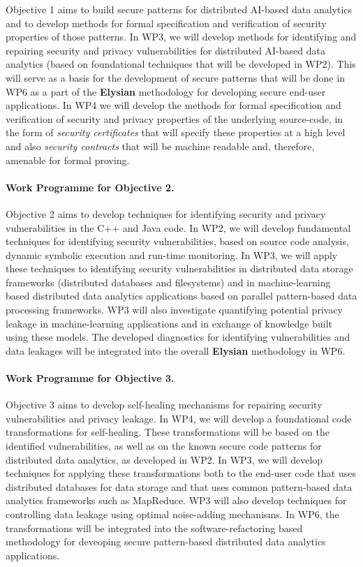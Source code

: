 \documentclass[a4paper,11pt]{article}
\newcommand{\project}[1]{\textbf{#1}\xspace}
\newcommand{\SECURITY}{\project{Elysian}}
\newcommand{\TheProject}{\SECURITY}
\begin{document}
Objective 1 aims to build secure patterns for distributed AI-based data analytics and to develop methods for formal specification and verification of security properties of those patterns. In WP3, we will develop methods for identifying and repairing security and privacy vulnerabilities for distributed AI-based data analytics (based on foundational techniques that will be developed in WP2). This will serve as a basis for the development of secure patterns that will be done in WP6 as a part of the \TheProject{} methodology for developing secure end-user applications. In WP4 we will develop the methods for formal specification and verification of security and privacy properties of the underlying source-code, in the form of \emph{security certificates} that will specify these properties at a high level and also \emph{security contracts} that will be machine readable and, therefore, amenable for formal proving. 

\paragraph*{Work Programme for Objective 2.}

Objective 2 aims to develop techniques for identifying security and privacy vulnerabilities in the C++ and Java code. In WP2, we will develop fundamental techniques for identifying security vulnerabilities, based on source code analysis, dynamic symbolic execution and run-time monitoring. In WP3, we will apply these techniques to identifying security vulnerabilities in distributed data storage frameworks (distributed databases and filesystems) and in machine-learning based distributed data analytics applications based on parallel pattern-based data processing frameworks. WP3 will also investigate quantifying potential privacy leakage in machine-learning applications and in exchange of knowledge built using these models. The developed diagnostics for identifying vulnerabilities and data leakages will be integrated into the overall \TheProject{} methodology in WP6.

\paragraph{Work Programme for Objective 3.}

Objective 3 aims to develop self-healing mechanisms for repairing security vulnerabilities and privacy leakage. In WP4, we will develop a foundational code transformations for self-healing. These transformations will be based on the identified vulnerabilities, as well as on the known secure code patterns for distributed data analytics, as developed in WP2. In WP3, we will develop techniques for applying these transformations both to the end-user code that uses distributed databases for data storage and that uses common pattern-based data analytics frameworks such as MapReduce. WP3 will also develop techniques for controlling data leakage using optimal noise-adding mechanisms. In WP6, the transformations will be integrated into the software-refactoring based methodology for deveoping secure pattern-based distributed data analytics applications. 
\end{document}
